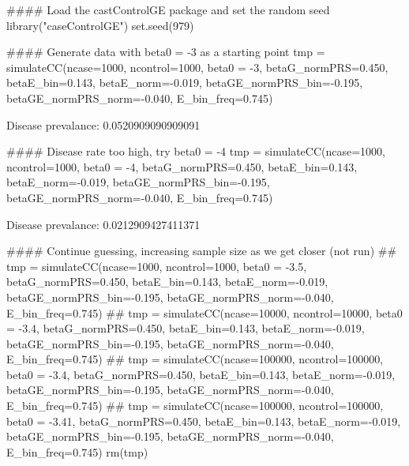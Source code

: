 \documentclass{article}\usepackage[]{graphicx}\usepackage[]{color}
\begin{document}
\begin{Schunk}
\begin{Sinput}
#### Load the castControlGE package and set the random seed
library("caseControlGE")
set.seed(979)

#### Generate data with beta0 = -3 as a starting point
tmp = simulateCC(ncase=1000, ncontrol=1000, beta0 = -3, betaG_normPRS=0.450,
                 betaE_bin=0.143, betaE_norm=-0.019, betaGE_normPRS_bin=-0.195,
                 betaGE_normPRS_norm=-0.040, E_bin_freq=0.745)
\end{Sinput}
\begin{Soutput}

Disease prevalance: 0.0520909090909091 
\end{Soutput}
\begin{Sinput}

#### Disease rate too high, try beta0 = -4
tmp = simulateCC(ncase=1000, ncontrol=1000, beta0 = -4, betaG_normPRS=0.450,
                 betaE_bin=0.143, betaE_norm=-0.019, betaGE_normPRS_bin=-0.195,
                 betaGE_normPRS_norm=-0.040, E_bin_freq=0.745)
\end{Sinput}
\begin{Soutput}

Disease prevalance: 0.0212909427411371 
\end{Soutput}
\begin{Sinput}

#### Continue guessing, increasing sample size as we get closer (not run)
## tmp = simulateCC(ncase=1000, ncontrol=1000, beta0 = -3.5, betaG_normPRS=0.450, betaE_bin=0.143, betaE_norm=-0.019, betaGE_normPRS_bin=-0.195, betaGE_normPRS_norm=-0.040, E_bin_freq=0.745)
## tmp = simulateCC(ncase=10000, ncontrol=10000, beta0 = -3.4, betaG_normPRS=0.450, betaE_bin=0.143, betaE_norm=-0.019, betaGE_normPRS_bin=-0.195, betaGE_normPRS_norm=-0.040, E_bin_freq=0.745)
## tmp = simulateCC(ncase=100000, ncontrol=100000, beta0 = -3.4, betaG_normPRS=0.450, betaE_bin=0.143, betaE_norm=-0.019, betaGE_normPRS_bin=-0.195, betaGE_normPRS_norm=-0.040, E_bin_freq=0.745)
## tmp = simulateCC(ncase=100000, ncontrol=100000, beta0 = -3.41, betaG_normPRS=0.450, betaE_bin=0.143, betaE_norm=-0.019, betaGE_normPRS_bin=-0.195, betaGE_normPRS_norm=-0.040, E_bin_freq=0.745)
rm(tmp)
\end{Sinput}
\end{Schunk}
\end{document}
